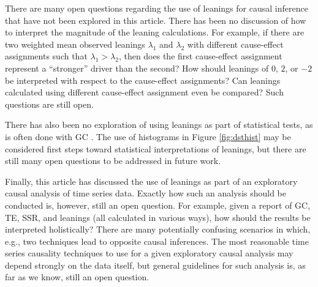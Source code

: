 \documentclass[a4paper,11pt,twocolumn]{article}
\begin{document}
There are many open questions regarding the use of leanings for causal inference that have not been explored in this article.  There has been no discussion of how to interpret the magnitude of the leaning calculations.  For example, if there are two weighted mean observed leanings $\lambda_1$ and $\lambda_2$ with different cause-effect assignments such that $\lambda_1 > \lambda_2$, then does the first cause-effect assignment represent a ``stronger'' driver than the second?  How should leanings of $0$, $2$, or $-2$ be interpreted with respect to the cause-effect assignments?  Can leanings calculated using different cause-effect assignment even be compared?  Such questions are still open.

There has also been no exploration of using leanings as part of statistical tests, as is often done with GC \cite{}.  The use of histograms in Figure \ref{fig:dsthist} may be considered first steps toward statistical interpretations of leanings, but there are still many open questions to be addressed in future work.

Finally, this article has discussed the use of leanings as part of an exploratory causal analysis of time series data.  Exactly how such an analysis should be conducted is, however, still an open question.  For example, given a report of GC, TE, SSR, and leanings (all calculated in various ways), how should the results be interpreted holistically?  There are many potentially confusing scenarios in which, e.g., two techniques lead to opposite causal inferences.  The most reasonable time series causality techniques to use for a given exploratory causal analysis may depend strongly on the data itself, but general guidelines for such analysis is, as far as we know, still an open question.


%
%
\end{document}
